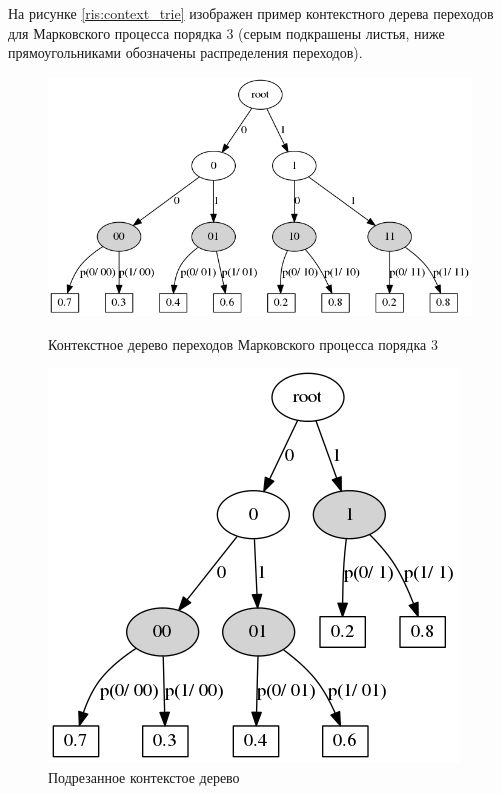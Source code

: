 \documentclass{matmex-diploma-custom}
\begin{document}
На рисунке \ref{ris:context_trie} изображен пример контекстного дерева переходов для Марковского процесса порядка $ 3 $ (серым подкрашены листья, ниже прямоугольниками обозначены распределения переходов).
\begin{figure}[h!]\centering
\begin{minipage}[b]{0.49 \textwidth}
	\includegraphics[scale=0.3]{img/Context_trie.png}
	\centering
	\caption{ Контекстное дерево переходов Марковского процесса порядка 3 }
	\label{ris:context_trie}
	
\end{minipage}
\hfil \hfil
\begin{minipage}[b]{0.49 \textwidth}
	\includegraphics[scale=0.3]{img/Prune_c_trie.png}
	\centering
	\caption{ Подрезанное контекстое дерево }
	\label{ris:prune_c_trie}
\end{minipage}
\end{figure}
\end{document}
